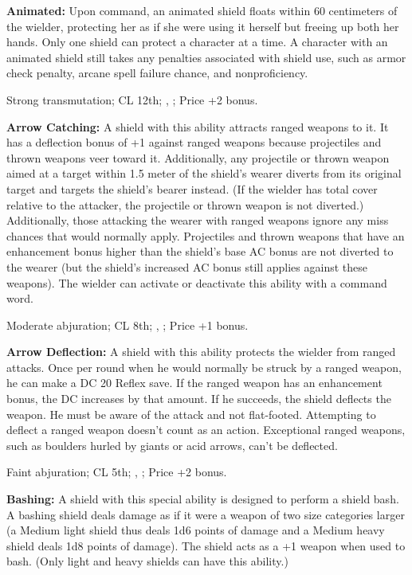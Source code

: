 \textbf{Animated:} Upon command, an animated shield floats within 60 centimeters of the wielder, protecting her as if she were using it herself but freeing up both her hands. Only one shield can protect a character at a time. A character with an animated shield still takes any penalties associated with shield use, such as armor check penalty, arcane spell failure chance, and nonproficiency.

Strong transmutation; CL 12th; , ; Price +2 bonus.

\textbf{Arrow Catching:} A shield with this ability attracts ranged weapons to it. It has a deflection bonus of +1 against ranged weapons because projectiles and thrown weapons veer toward it. Additionally, any projectile or thrown weapon aimed at a target within 1.5 meter of the shield's wearer diverts from its original target and targets the shield's bearer instead. (If the wielder has total cover relative to the attacker, the projectile or thrown weapon is not diverted.) Additionally, those attacking the wearer with ranged weapons ignore any miss chances that would normally apply. Projectiles and thrown weapons that have an enhancement bonus higher than the shield's base AC bonus are not diverted to the wearer (but the shield's increased AC bonus still applies against these weapons). The wielder can activate or deactivate this ability with a command word.

Moderate abjuration; CL 8th; , ; Price +1 bonus.

\textbf{Arrow Deflection:} A shield with this ability protects the wielder from ranged attacks. Once per round when he would normally be struck by a ranged weapon, he can make a DC 20 Reflex save. If the ranged weapon has an enhancement bonus, the DC increases by that amount. If he succeeds, the shield deflects the weapon. He must be aware of the attack and not flat-footed. Attempting to deflect a ranged weapon doesn't count as an action. Exceptional ranged weapons, such as boulders hurled by giants or acid arrows, can't be deflected.

Faint abjuration; CL 5th; , ; Price +2 bonus.

\textbf{Bashing:} A shield with this special ability is designed to perform a shield bash. A bashing shield deals damage as if it were a weapon of two size categories larger (a Medium light shield thus deals 1d6 points of damage and a Medium heavy shield deals 1d8 points of damage). The shield acts as a +1 weapon when used to bash. (Only light and heavy shields can have this ability.)

